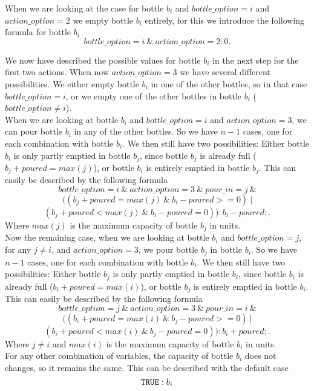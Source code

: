 \documentclass[a4paper]{article}
\begin{document}
	When we are looking at the case for bottle $b_i$ and $bottle\_option = i$ and $action\_option = 2$ we empty bottle $b_i$ entirely, for this we introduce the following formula for bottle $b_i$
\[ bottle\_option = i\ \&\ action\_option = 2 : 0.\]

	We now have described the possible values for bottle $b_i$ in the next step for the first two actions. When now $action\_option = 3$ we have several different possibilities. We either empty bottle $b_i$ in one of the other bottles, so in that case $bottle\_option = i$, or we empty one of the other bottles in bottle $b_i$ ($bottle\_option \neq i$).\\
	
	When we are looking at bottle $b_i$ and $bottle\_option = i$ and $action\_option = 3$, we can pour bottle $b_i$ in any of the other bottles. So we have $n-1$ cases, one for each combination with bottle $b_i$. We then still have two possibilities: Either bottle $b_i$ is only partly emptied in bottle $b_j$, since bottle $b_j$ is already full ($b_j + poured = max(j)$), or bottle $b_i$ is entirely emptied in bottle $b_j$. This can easily be described by the following formula
\[ bottle\_option = i\ \&\ action\_option = 3\ \&\ pour\_in = j\ \& \]
\[ ((b_j + poured = max(j)\ \&\ b_i - poured >= 0)\ | \]
\[ (b_j + poured < max(j)\ \&\ b_i - poured = 0)) : b_i - poured;.\]
Where $max(j)$ is the maximum capacity of bottle $b_j$ in units.\\

	Now the remaining case, when we are looking at bottle $b_i$ and $bottle\_option = j$, for any $j \neq i$, and $action\_option = 3$, we pour bottle $b_j$ in bottle $b_i$. So we have $n-1$ cases, one for each combination with bottle $b_i$. We then still have two possibilities: Either bottle $b_j$ is only partly emptied in bottle $b_i$, since bottle $b_i$ is already full ($b_i + poured = max(i)$), or bottle $b_j$ is entirely emptied in bottle $b_i$. This can easily be described by the following formula
\[ bottle\_option = j\ \&\ action\_option = 3\ \&\ pour\_in = i\ \& \]
\[ ((b_i + poured = max(i)\ \&\ b_j - poured >= 0)\ | \]
\[ (b_i + poured < max(i)\ \&\ b_j - poured = 0)) : b_i + poured;.\]
Where $j \neq i$ and $max(i)$ is the maximum capacity of bottle $b_i$ in units.\\

	For any other combination of variables, the capacity of bottle $b_i$ does not changes, so it remains the same. This can be described with the default case
	\[ {\tt TRUE} : b_i \]
	
\end{document}
